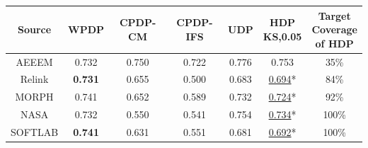 \begin{table}[t]
\begin{tabular}{|@{ }c@{ }|@{ }c@{ }|@{ }c@{ }|@{ }c@{ }|@{ }c@{ }|@{ }c@{ }||@{ }c@{ }|}
{\bf Source}
& WPDP
& CPDP-CM
& CPDP-IFS
& UDP
& \specialcell{{HDP}\\{KS,0.05}}
& \specialcell{{Target}\\{Coverage}\\{of HDP}} \\ \hline \hline
AEEEM       &0.732  &0.750  &0.722  &0.776  &0.753    &35\%\\ \hline %
Relink      &{\bf 0.731}    &0.655  &0.500  &0.683  &\underline{0.694}*      &84\%\\ \hline %
MORPH       &0.741  &0.652  &0.589  &0.732  &\underline{0.724}*     &92\%\\ \hline	%
NASA        &0.732  &0.550  &0.541  &0.754  &\underline{0.734}*       &100\%\\ \hline %
SOFTLAB     &{\bf 0.741}    &0.631  &0.551  &0.681  &\underline{0.692}*      &100\%\\ \hline	%



\end{tabular}
\end{table}

